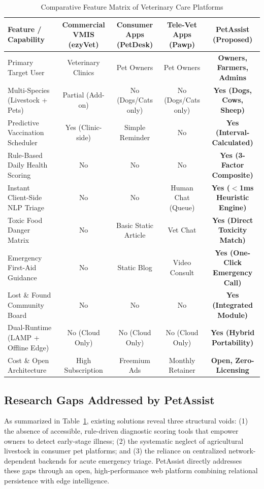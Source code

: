 \documentclass[conference]{IEEEtran}
\begin{document}
\begin{table}[t]
\caption{Comparative Feature Matrix of Veterinary Care Platforms}
\label{tab:comparative_matrix}
\centering
\begin{tabular}{lcccc}
\toprule
\textbf{Feature / Capability} & \textbf{Commercial VMIS (ezyVet)} & \textbf{Consumer Apps (PetDesk)} & \textbf{Tele-Vet Apps (Pawp)} & \textbf{PetAssist (Proposed)} \\
\midrule
Primary Target User & Veterinary Clinics & Pet Owners & Pet Owners & \textbf{Owners, Farmers, Admins} \\
Multi-Species (Livestock + Pets) & Partial (Add-on) & No (Dogs/Cats only) & No (Dogs/Cats only) & \textbf{Yes (Dogs, Cows, Sheep)} \\
Predictive Vaccination Scheduler & Yes (Clinic-side) & Simple Reminder & No & \textbf{Yes (Interval-Calculated)} \\
Rule-Based Daily Health Scoring & No & No & No & \textbf{Yes (3-Factor Composite)} \\
Instant Client-Side NLP Triage & No & No & Human Chat (Queue) & \textbf{Yes ($<$1ms Heuristic Engine)} \\
Toxic Food Danger Matrix & No & Basic Static Article & Vet Chat & \textbf{Yes (Direct Toxicity Match)} \\
Emergency First-Aid Guidance & No & Static Blog & Video Consult & \textbf{Yes (One-Click Emergency Call)} \\
Lost \& Found Community Board & No & No & No & \textbf{Yes (Integrated Module)} \\
Dual-Runtime (LAMP + Offline Edge) & No (Cloud Only) & No (Cloud Only) & No (Cloud Only) & \textbf{Yes (Hybrid Portability)} \\
Cost \& Open Architecture & High Subscription & Freemium Ads & Monthly Retainer & \textbf{Open, Zero-Licensing} \\
\bottomrule
\end{tabular}
\end{table}

\subsection{Research Gaps Addressed by PetAssist}
As summarized in Table~\ref{tab:comparative_matrix}, existing solutions reveal three structural voids: (1) the absence of accessible, rule-driven diagnostic scoring tools that empower owners to detect early-stage illness; (2) the systematic neglect of agricultural livestock in consumer pet platforms; and (3) the reliance on centralized network-dependent backends for acute emergency triage. PetAssist directly addresses these gaps through an open, high-performance web platform combining relational persistence with edge intelligence.
\end{document}
